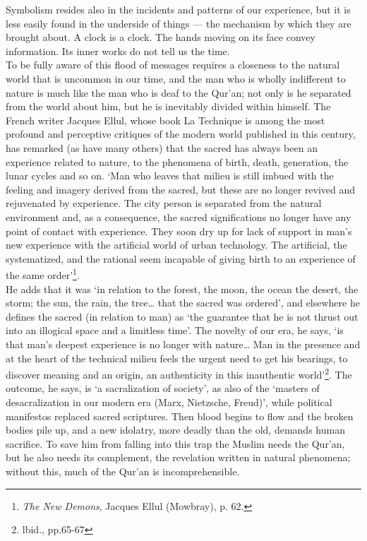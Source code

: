 \documentclass[10pt, twoside]{book}
\begin{document}
Symbolism resides also in the incidents and patterns of our experience, but it is less easily found 
in the underside of things --- the mechanism by which they are brought about. A clock is a clock. The 
hands moving on its face convey information. Its inner works do not tell us the time. \\

To be fully aware of this flood of messages requires a closeness to the natural world that is 
uncommon in our time, and the man who is wholly indifferent to nature is much like the man who is 
deaf to the Qur'an; not only is he separated from the world about him, but he is inevitably divided 
within himself. The French writer Jacques Ellul, whose book La Technique is among the most profound 
and perceptive critiques of the modern world published in this century, has remarked (as have many 
others) that the sacred has always been an experience related to nature, to the phenomena of birth, 
death, generation, the lunar cycles and so on. `Man who leaves that milieu is still imbued with the 
feeling and imagery derived from the sacred, but these are no longer revived and rejuvenated by 
experience. The city person is separated from the natural environment and, as a consequence, the 
sacred significations no longer have any point of contact with experience. They soon dry up for lack 
of support in man's new experience with the artificial world of urban technology. The artificial, the 
systematized, and the rational seem incapable of giving birth to an experience of the same 
order'\footnote{\emph{The New Demons}, Jacques Ellul (Mowbray), p. 62.}.\\

He adds that it was `in relation to the forest, the moon, the ocean the desert, the storm; the sun, 
the rain, the tree\ldots{} that the sacred was ordered', and elsewhere he defines the sacred (in relation 
to man) as `the guarantee that he is not thrust out into an illogical space and a limitless time'. 
The novelty of our era, he says, `is that man's deepest experience is no longer with nature\ldots{} Man in 
the presence and at the heart of the technical milieu feels the urgent need to get his bearings, to 
discover meaning and an origin, an authenticity in this inauthentic world'\footnote{lbid., pp.65-67}. The outcome, he says, is `a sacralization of society', as also of the `masters of desacralization in our modern era (Marx, Nietzsche, Freud)', while political manifestos replaced sacred scriptures. Then blood begins to flow and the broken bodies pile up, and a new idolatry, more deadly than the old, demands human sacrifice. To save him from falling into this trap the Muslim needs the Qur'an, but he also needs its 
complement, the revelation written in natural phenomena; without this, much of the Qur'an is 
incomprehensible. \\
\end{document}
